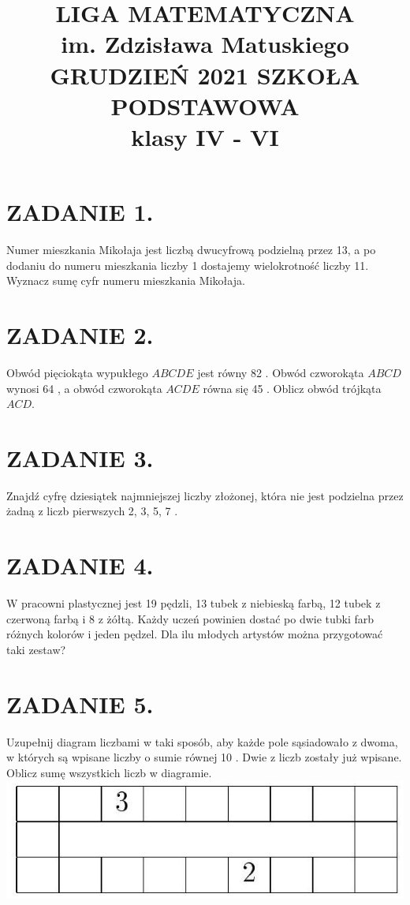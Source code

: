 \documentclass[10pt]{article}
\title{LIGA MATEMATYCZNA \\
 im. Zdzisława Matuskiego GRUDZIEŃ 2021 SZKOŁA PODSTAWOWA \\
 klasy IV - VI }
\author{}
\date{}
\begin{document}
\maketitle
\section*{ZADANIE 1.}
Numer mieszkania Mikołaja jest liczbą dwucyfrową podzielną przez 13, a po dodaniu do numeru mieszkania liczby 1 dostajemy wielokrotność liczby 11. Wyznacz sumę cyfr numeru mieszkania Mikołaja.

\section*{ZADANIE 2.}
Obwód pięciokąta wypukłego \(A B C D E\) jest równy 82 . Obwód czworokąta \(A B C D\) wynosi 64 , a obwód czworokąta \(A C D E\) równa się 45 . Oblicz obwód trójkąta \(A C D\).

\section*{ZADANIE 3.}
Znajdź cyfrę dziesiątek najmniejszej liczby złożonej, która nie jest podzielna przez żadną z liczb pierwszych 2, 3, 5, 7 .

\section*{ZADANIE 4.}
W pracowni plastycznej jest 19 pędzli, 13 tubek z niebieską farbą, 12 tubek z czerwoną farbą i 8 z żółtą. Każdy uczeń powinien dostać po dwie tubki farb różnych kolorów i jeden pędzel. Dla ilu młodych artystów można przygotować taki zestaw?

\section*{ZADANIE 5.}
Uzupełnij diagram liczbami w taki sposób, aby każde pole sąsiadowało z dwoma, w których są wpisane liczby o sumie równej 10 . Dwie z liczb zostały już wpisane. Oblicz sumę wszystkich liczb w diagramie.\\
\includegraphics[max width=\textwidth, center]{2024_11_21_1a8d26d2d1f00028bc7ag-1}
\end{document}

